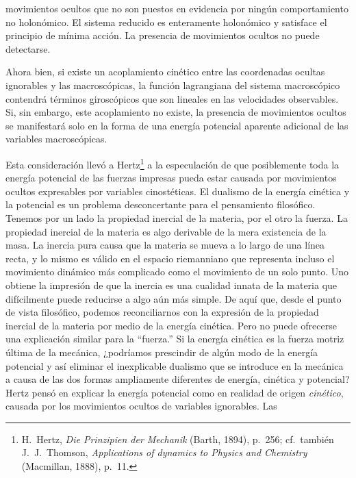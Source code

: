 \documentclass[12pt,a4paper]{book}
\begin{document}

movimientos ocultos que no son puestos en evidencia por ningún comportamiento no holonómico. El sistema reducido es enteramente holonómico y satisface el principio de mínima acción. La presencia de movimientos ocultos no puede detectarse.

Ahora bien, si existe un acoplamiento cinético entre las coordenadas ocultas ignorables y las macroscópicas, la función lagrangiana del sistema macroscópico contendrá términos giroscópicos que son lineales en las velocidades observables. Si, sin embargo, este acoplamiento no existe, la presencia de movimientos ocultos se manifestará solo en la forma de una energía potencial aparente adicional de las variables macroscópicas.

Esta consideración llevó a Hertz\footnote{H.~Hertz, \textit{Die Prinzipien der Mechanik} (Barth, 1894), p.~256; cf.\ también J.~J.~Thomson, \textit{Applications of dynamics to Physics and Chemistry} (Macmillan, 1888), p.~11.} a la especulación de que posiblemente toda la energía potencial de las fuerzas impresas pueda estar causada por movimientos ocultos expresables por variables cinostéticas. El dualismo de la energía cinética y la potencial es un problema desconcertante para el pensamiento filosófico. Tenemos por un lado la propiedad inercial de la materia, por el otro la fuerza. La propiedad inercial de la materia es algo derivable de la mera existencia de la masa. La inercia pura causa que la materia se mueva a lo largo de una línea recta, y lo mismo es válido en el espacio riemanniano que representa incluso el movimiento dinámico más complicado como el movimiento de un solo punto. Uno obtiene la impresión de que la inercia es una cualidad innata de la materia que difícilmente puede reducirse a algo aún más simple. De aquí que, desde el punto de vista filosófico, podemos reconciliarnos con la expresión de la propiedad inercial de la materia por medio de la energía cinética. Pero no puede ofrecerse una explicación similar para la ``fuerza.'' Si la energía cinética es la fuerza motriz última de la mecánica, ¿podríamos prescindir de algún modo de la energía potencial y así eliminar el inexplicable dualismo que se introduce en la mecánica a causa de las dos formas ampliamente diferentes de energía, cinética y potencial? Hertz pensó en explicar la energía potencial como en realidad de origen \textit{cinético}, causada por los movimientos ocultos de variables ignorables. Las

\end{document}
